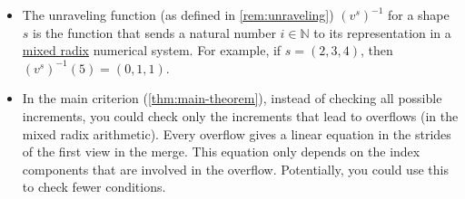 \documentclass{article}
\theoremstyle{definition} %
\newcommand{\bN}{\mathbb{N}}
\begin{document}
\begin{itemize}
  \item The unraveling function (as defined in \cref{rem:unraveling}) $(v^s)^{-1}$
    for a shape $s$ is the function that sends a natural number $i \in \bN$
    to its representation in a \href{https://en.wikipedia.org/wiki/Mixed_radix}{mixed radix} numerical system.
    For example, if $s = (2, 3, 4)$, then $(v^s)^{-1}(5) = (0, 1, 1)$.
  \item In the main criterion (\cref{thm:main-theorem}),
    instead of checking all possible increments, you could check only the increments
    that lead to overflows (in the mixed radix arithmetic).
    Every overflow gives a linear equation in the strides of the first view in the merge.
    This equation only depends on the index components that are involved in the overflow.
    Potentially, you could use this to check fewer conditions.
\end{itemize}
\end{document}
